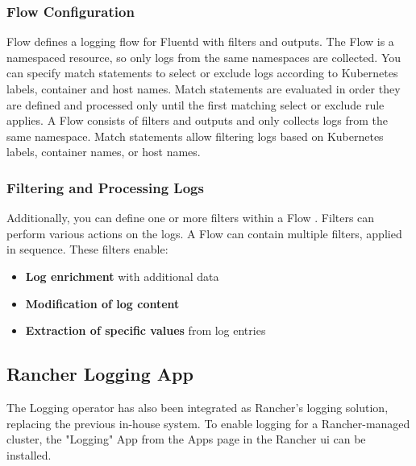 \documentclass[../main.tex]{subfiles}
\begin{document}

\subsubsection{Flow Configuration}

Flow defines a logging flow for Fluentd with filters and outputs. The Flow is a namespaced resource, so only logs from the same namespaces are collected. You can specify match statements to select or exclude logs according to Kubernetes labels, container and host names. Match statements are evaluated in order they are defined and processed only until the first matching select or exclude rule applies. A Flow consists of filters and outputs and only collects logs from the same namespace. Match statements allow filtering logs based on Kubernetes labels, container names, or host names. \cite{logconfig}

\subsubsection{Filtering and Processing Logs}

Additionally, you can define one or more filters within a Flow \cite{fluentdfilters}. Filters can perform various actions on the logs. A Flow can contain multiple filters, applied in sequence. These filters enable:

\begin{itemize}
    \item \textbf{Log enrichment} with additional data
    \item \textbf{Modification of log content}
    \item \textbf{Extraction of specific values} from log entries
\end{itemize}


\subsection{Rancher Logging App}

The Logging operator has also been integrated as Rancher's logging solution, replacing the previous in-house system. To enable logging for a Rancher-managed cluster, the "Logging" App from the Apps page in the Rancher \gls{ui} can be installed.
\end{document}
